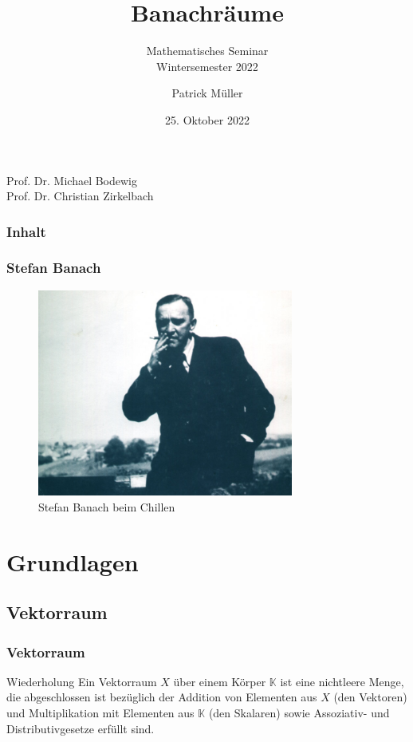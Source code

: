 \documentclass[t, handout]{beamer}
\title[Ailurus fulgens]{Banachräume}
\subtitle{Mathematisches Seminar\\ Wintersemester 2022}
\author{Patrick Müller}
\institute[LT]{Fakultät Angewandte Natur- und Geisteswissenschaften}
\date{25. Oktober 2022}
\newcommand{\K}{\mathbb{K}}
\theoremstyle{definition} %
\begin{document}
\renewcommand{\figurename}{Abb.}

\begin{frame}
\titlepage
\vspace{5pt}
{\centering \scriptsize{Prof. Dr. Michael Bodewig\\Prof. Dr. Christian Zirkelbach} \par}
\end{frame}
\begin{frame}
\frametitle{Inhalt}
\tableofcontents
\end{frame}

\begin{frame}
\frametitle{Stefan Banach}
\centering
\begin{figure}
\includegraphics[width=0.75\textwidth]{pictures/stefan-banach.jpg}
\caption{Stefan Banach beim Chillen \cite{StefanBanach}}
\end{figure}
\end{frame}
\section{Grundlagen}

\subsection{Vektorraum}

\begin{frame}
\frametitle{Vektorraum}
\begin{block}{Wiederholung}
Ein Vektorraum $X$ über einem Körper $\K$ ist eine nichtleere Menge, die abgeschlossen ist bezüglich der Addition von Elementen aus $X$ (den Vektoren) und Multiplikation mit Elementen aus $\K$ (den Skalaren) sowie Assoziativ- und Distributivgesetze erfüllt sind.
\end{block}
\end{frame}
\end{document}
